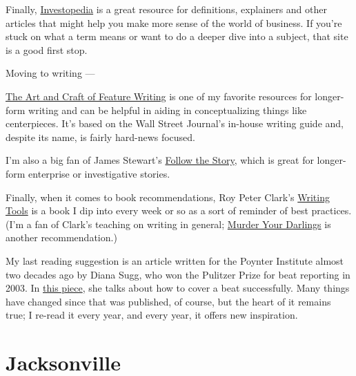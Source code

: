 \documentclass[
  11pt,
  american,
  letterpaperpaper,
  extrafontsizes,onecolumn,openright
  ]{memoir}
\begin{document}
Finally, \href{https://www.investopedia.com/}{Investopedia} is a great resource for definitions, explainers and other articles that might help you make more sense of the world of business. If you're stuck on what a term means or want to do a deeper dive into a subject, that site is a good first stop.

Moving to writing ---

\href{https://www.amazon.com/Art-Craft-Feature-Writing-Journal/dp/0452261589/ref=sr_1_1}{The Art and Craft of Feature Writing} is one of my favorite resources for longer-form writing and can be helpful in aiding in conceptualizing things like centerpieces. It's based on the Wall Street Journal's in-house writing guide and, despite its name, is fairly hard-news focused.

I'm also a big fan of James Stewart's \href{https://www.amazon.com/Follow-Story-Write-Successful-Nonfiction/dp/0684850672/ref=sr_1_1}{Follow the Story}, which is great for longer-form enterprise or investigative stories.

Finally, when it comes to book recommendations, Roy Peter Clark's \href{https://www.amazon.com/Writing-Tools-Essential-Strategies-Writer/dp/0316014990/ref=sr_1_1}{Writing Tools} is a book I dip into every week or so as a sort of reminder of best practices. (I'm a fan of Clark's teaching on writing in general; \href{https://www.amazon.com/Murder-Your-Darlings-Writing-Aristotle/dp/0316481882/ref=tmm_hrd_swatch_0}{Murder Your Darlings} is another recommendation.)

My last reading suggestion is an article written for the Poynter Institute almost two decades ago by Diana Sugg, who won the Pulitzer Prize for beat reporting in 2003. In \href{https://acbj-my.sharepoint.com/personal/tgibbons_bizjournals_com/_layouts/15/onedrive.aspx?id=\%2Fpersonal\%2Ftgibbons\%5Fbizjournals\%5Fcom\%2FDocuments\%2FTurn\%20the\%20Beat\%20Around\%5FPoynter\%2Epdf\&parent=\%2Fpersonal\%2Ftgibbons\%5Fbizjournals\%5Fcom\%2FDocuments}{this piece}, she talks about how to cover a beat successfully. Many things have changed since that was published, of course, but the heart of it remains true; I re-read it every year, and every year, it offers new inspiration.

\hypertarget{jacksonville}{%
\section*{Jacksonville}\label{jacksonville}}
\end{document}
